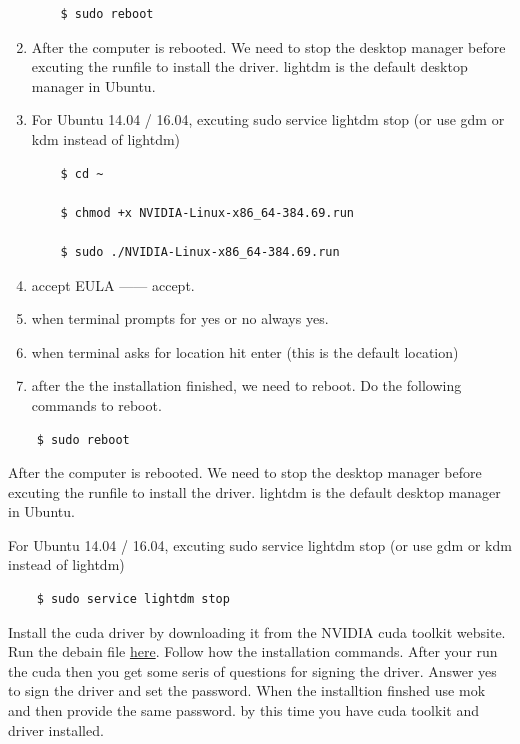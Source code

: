 \documentclass[12pt]{article}
\begin{document}
\begin{enumerate}
\begin{lstlisting}
    $ sudo reboot
\end{lstlisting}

\item After the computer is rebooted. We need to stop the desktop manager before excuting the runfile to install the driver. lightdm is the default desktop manager in Ubuntu. 
\item  For Ubuntu 14.04 / 16.04, excuting sudo service lightdm stop (or use gdm or kdm instead of lightdm)


\begin{lstlisting}
    $ cd ~
    
    $ chmod +x NVIDIA-Linux-x86_64-384.69.run
    
    $ sudo ./NVIDIA-Linux-x86_64-384.69.run 

\end{lstlisting}

\item accept EULA ------ accept.
\item when terminal prompts for yes or no always yes.
\item when terminal asks for location hit enter (this is the default location)
\item after the the installation finished, we need to reboot. Do the following commands to reboot.
\end{enumerate}

\begin{lstlisting}
    $ sudo reboot
\end{lstlisting}

\item After the computer is rebooted. We need to stop the desktop manager before excuting the runfile to install the driver. lightdm is the default desktop manager in Ubuntu.
\item  For Ubuntu 14.04 / 16.04, excuting sudo service lightdm stop (or use gdm or kdm instead of lightdm)

\begin{lstlisting}
    $ sudo service lightdm stop
\end{lstlisting}

Install the cuda driver by downloading it from the NVIDIA cuda toolkit website. Run the debain file \href{https://developer.nvidia.com/cuda-downloads}{here}. Follow how the installation commands. After your run the cuda then you get some seris of questions for signing the driver. Answer yes to sign the driver and set the password. When the installtion finshed use mok and then provide the same password. by this time you have cuda toolkit and driver installed.
\end{document}
